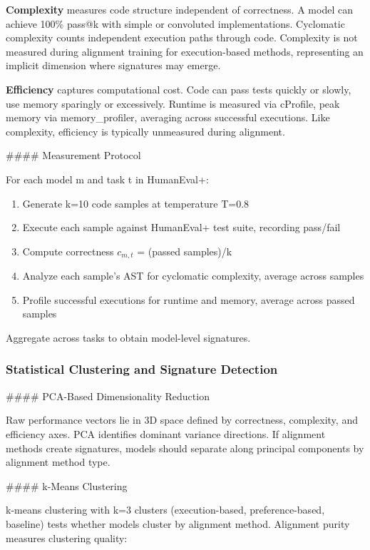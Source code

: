 \textbf{Complexity} measures code structure independent of correctness. A model can achieve 100\% pass@k with simple or convoluted implementations. Cyclomatic complexity counts independent execution paths through code. Complexity is not measured during alignment training for execution-based methods, representing an implicit dimension where signatures may emerge.

\textbf{Efficiency} captures computational cost. Code can pass tests quickly or slowly, use memory sparingly or excessively. Runtime is measured via cProfile, peak memory via memory\_profiler, averaging across successful executions. Like complexity, efficiency is typically unmeasured during alignment.

\#\#\#\# Measurement Protocol

For each model m and task t in HumanEval+:

\begin{enumerate}
\item Generate k=10 code samples at temperature T=0.8
\item Execute each sample against HumanEval+ test suite, recording pass/fail
\item Compute correctness $c_{m,t}$ = (passed samples)/k
\item Analyze each sample's AST for cyclomatic complexity, average across samples
\item Profile successful executions for runtime and memory, average across passed samples
\end{enumerate}

Aggregate across tasks to obtain model-level signatures.

\subsubsection{Statistical Clustering and Signature Detection}

\#\#\#\# PCA-Based Dimensionality Reduction

Raw performance vectors lie in 3D space defined by correctness, complexity, and efficiency axes. PCA identifies dominant variance directions. If alignment methods create signatures, models should separate along principal components by alignment method type.

\#\#\#\# k-Means Clustering

k-means clustering with k=3 clusters (execution-based, preference-based, baseline) tests whether models cluster by alignment method. Alignment purity measures clustering quality:

